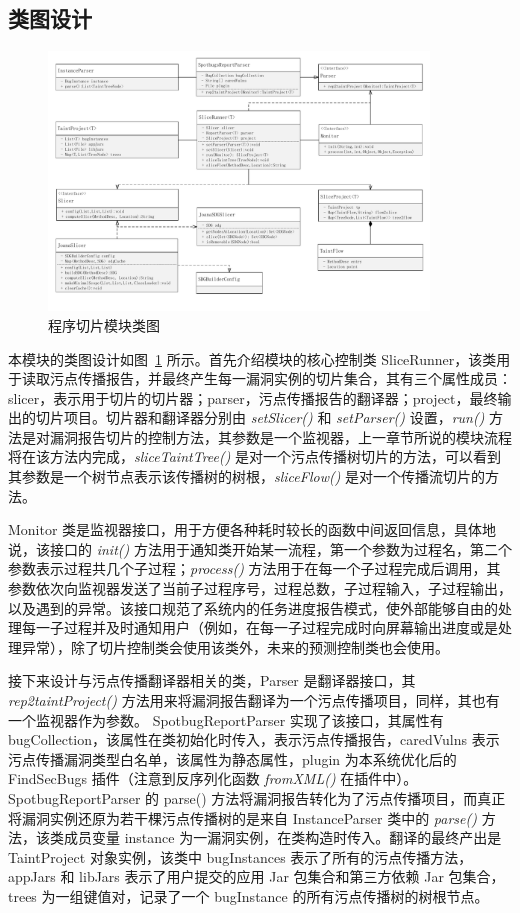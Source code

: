 \subsection{类图设计}

\begin{figure}[!htb]
    \centering
    \includegraphics[width=0.9\textwidth]{FIGs/chapter3/sliceClass.pdf}
    \caption{程序切片模块类图}\label{sliceClass}
\end{figure}

本模块的类图设计如图~\ref{sliceClass} 所示。首先介绍模块的核心控制类 SliceRunner，该类用于读取污点传播报告，并最终产生每一漏洞实例的切片集合，其有三个属性成员：slicer，表示用于切片的切片器；parser，污点传播报告的翻译器；project，最终输出的切片项目。切片器和翻译器分别由 \textit{setSlicer()} 和 \textit{setParser()} 设置，\textit{run()} 方法是对漏洞报告切片的控制方法，其参数是一个监视器，上一章节所说的模块流程将在该方法内完成，\textit{sliceTaintTree()} 是对一个污点传播树切片的方法，可以看到其参数是一个树节点表示该传播树的树根，\textit{sliceFlow()} 是对一个传播流切片的方法。

Monitor 类是监视器接口，用于方便各种耗时较长的函数中间返回信息，具体地说，该接口的 \textit{init()} 方法用于通知类开始某一流程，第一个参数为过程名，第二个参数表示过程共几个子过程；\textit{process()} 方法用于在每一个子过程完成后调用，其参数依次向监视器发送了当前子过程序号，过程总数，子过程输入，子过程输出，以及遇到的异常。该接口规范了系统内的任务进度报告模式，使外部能够自由的处理每一子过程并及时通知用户（例如，在每一子过程完成时向屏幕输出进度或是处理异常），除了切片控制类会使用该类外，未来的预测控制类也会使用。

接下来设计与污点传播翻译器相关的类，Parser 是翻译器接口，其 \textit{rep2taintProject()} 方法用来将漏洞报告翻译为一个污点传播项目，同样，其也有一个监视器作为参数。 SpotbugReportParser 实现了该接口，其属性有 bugCollection，该属性在类初始化时传入，表示污点传播报告，caredVulns 表示污点传播漏洞类型白名单，该属性为静态属性，plugin 为本系统优化后的 FindSecBugs 插件（注意到反序列化函数 \textit{fromXML()} 在插件中）。SpotbugReportParser 的 parse() 方法将漏洞报告转化为了污点传播项目，而真正将漏洞实例还原为若干棵污点传播树的是来自 InstanceParser 类中的 \textit{parse()} 方法，该类成员变量 instance 为一漏洞实例，在类构造时传入。翻译的最终产出是 TaintProject 对象实例，该类中 bugInstances 表示了所有的污点传播方法，appJars 和 libJars 表示了用户提交的应用 Jar 包集合和第三方依赖 Jar 包集合，trees 为一组键值对，记录了一个 bugInstance 的所有污点传播树的树根节点。

